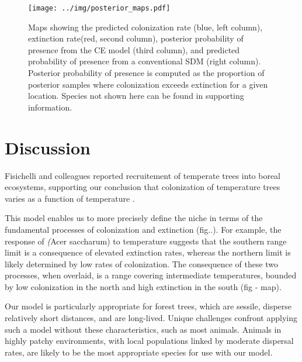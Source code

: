\documentclass[11pt]{article}
\begin{document}
\begin{figure}
	\texttt{[image: ../img/posterior\_maps.pdf]}
	\caption{
		Maps showing the predicted colonization rate (blue, left column), extinction rate(red, second column), posterior probability of presence from the CE model (third column), and predicted probability of presence from a conventional SDM (right column).
		Posterior probability of presence is computed as the proportion of posterior samples where colonization exceeds extinction for a given location.
		Species not shown here can be found in supporting information.
	}
	\label{fig:response_curves}
\end{figure}


\section*{Discussion}

Fisichelli and colleagues reported recruitement of temperate trees into boreal ecosystems, supporting our conclusion that colonization of temperature trees varies as a function of temperature \cite{Fisichelli2014}.



This model enables us to more precisely define the niche in terms of the fundamental processes of colonization and extinction (fig..). 
For example, the response of \emph(Acer saccharum) to temperature suggests that the southern range limit is a consequence of elevated extinction rates, whereas the northern limit is likely determined by low rates of colonization.
The consequence of these two processes, when overlaid, is a range covering intermediate temperatures, bounded by low colonization in the north and high extinction in the south (fig - map).

Our model is particularly appropriate for forest trees, which are sessile, disperse relatively short distances, and are long-lived. 
Unique challenges confront applying such a model without these characteristics, such as most animals. 
Animals in highly patchy environments, with local populations linked by moderate dispersal rates, are likely to be the most appropriate species for use with our model.
\end{document}
